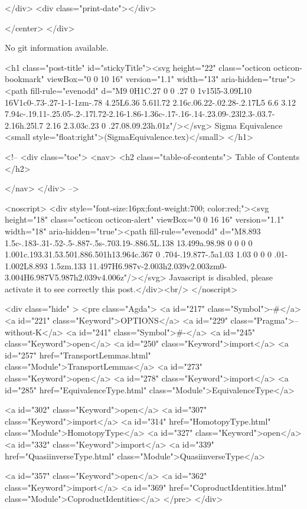           
        </div>
        <div class="print-date"></div>
        
        
    </center>
  </div>

  
  No git information available.
  

  <h1 class="post-title" id="stickyTitle"><svg height="22" class="octicon octicon-bookmark" viewBox="0 0 10 16" version="1.1" width="13" aria-hidden="true"><path fill-rule="evenodd" d="M9 0H1C.27 0 0 .27 0 1v15l5-3.09L10 16V1c0-.73-.27-1-1-1zm-.78 4.25L6.36 5.61l.72 2.16c.06.22-.02.28-.2.17L5 6.6 3.12 7.94c-.19.11-.25.05-.2-.17l.72-2.16-1.86-1.36c-.17-.16-.14-.23.09-.23l2.3-.03.7-2.16h.25l.7 2.16 2.3.03c.23 0 .27.08.09.23h.01z"/></svg> Sigma Equivalence <small style="float:right">(SigmaEquivalence.tex)</small>
  </h1>

  <!-- 
  <div class="toc">
    <nav>
    <h2 class="table-of-contents"> Table of Contents </h2>
      

    </nav>
  </div>
   -->

  <noscript>
  <div style="font-size:16px;font-weight:700; color:red;"><svg height="18" class="octicon octicon-alert" viewBox="0 0 16 16" version="1.1" width="18" aria-hidden="true"><path fill-rule="evenodd" d="M8.893 1.5c-.183-.31-.52-.5-.887-.5s-.703.19-.886.5L.138 13.499a.98.98 0 0 0 0 1.001c.193.31.53.501.886.501h13.964c.367 0 .704-.19.877-.5a1.03 1.03 0 0 0 .01-1.002L8.893 1.5zm.133 11.497H6.987v-2.003h2.039v2.003zm0-3.004H6.987V5.987h2.039v4.006z"/></svg> Javascript is disabled, please activate it to see correctly this post.</div><br/>
  </noscript>

  <div class="hide" >
<pre class="Agda">
<a id="217" class="Symbol">{-#</a> <a id="221" class="Keyword">OPTIONS</a> <a id="229" class="Pragma">--without-K</a> <a id="241" class="Symbol">#-}</a>
<a id="245" class="Keyword">open</a> <a id="250" class="Keyword">import</a> <a id="257" href="TransportLemmas.html" class="Module">TransportLemmas</a>
<a id="273" class="Keyword">open</a> <a id="278" class="Keyword">import</a> <a id="285" href="EquivalenceType.html" class="Module">EquivalenceType</a>

<a id="302" class="Keyword">open</a> <a id="307" class="Keyword">import</a> <a id="314" href="HomotopyType.html" class="Module">HomotopyType</a>
<a id="327" class="Keyword">open</a> <a id="332" class="Keyword">import</a> <a id="339" href="QuasiinverseType.html" class="Module">QuasiinverseType</a>

<a id="357" class="Keyword">open</a> <a id="362" class="Keyword">import</a> <a id="369" href="CoproductIdentities.html" class="Module">CoproductIdentities</a>
</pre>
</div>


